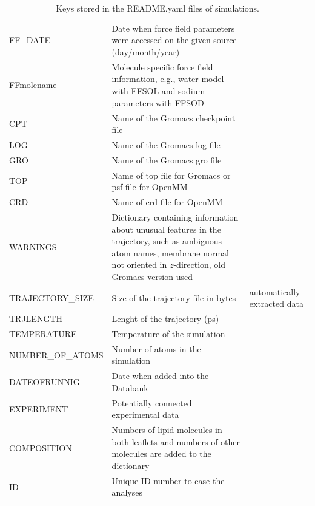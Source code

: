 \documentclass[fleqn,10pt]{wlscirepSI}
\begin{document}
\begin{table}[!h]
\begin{tabular}{  p{3.5cm}  p{9.5cm}  p{4.0cm} }
    FF\_DATE &  Date when force field parameters were accessed on the given source (day/month/year) & \\
    FF{molename} & Molecule specific force field information, e.g., water model with FFSOL and sodium parameters with FFSOD & \\
    CPT & Name of the Gromacs checkpoint file & \\
    LOG & Name of the Gromacs log file & \\
    GRO & Name of the Gromacs gro file & \\
    TOP & Name of top file for Gromacs or psf file for OpenMM & \\
    CRD & Name of crd file for OpenMM & \\
    WARNINGS & Dictionary containing information about unusual features in the trajectory, such as ambiguous atom names, membrane normal not oriented in $z$-direction, old Gromacs version used & \\
    \hline
    TRAJECTORY\_SIZE & Size of the trajectory file in bytes & automatically extracted data \\
    TRJLENGTH & Lenght of the trajectory (ps) & \\
    TEMPERATURE & Temperature of the simulation & \\
    NUMBER\_OF\_ATOMS & Number of atoms in the simulation & \\
    DATEOFRUNNIG & Date when added into the Databank & \\
    EXPERIMENT & Potentially connected experimental data & \\
    COMPOSITION & Numbers of lipid molecules in both leaflets and numbers of other molecules are added to the dictionary & \\
    ID & Unique ID number to ease the analyses & \\
    \end{tabular}
    \caption{Keys stored in the README.yaml files of simulations.}
    \label{tab:READMEkeys}
\end{table}
\end{document}
